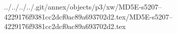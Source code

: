 ../../../../.git/annex/objects/p3/xw/MD5E-s5207--4229176f9381cc2dcf0ac89a693702d2.tex/MD5E-s5207--4229176f9381cc2dcf0ac89a693702d2.tex